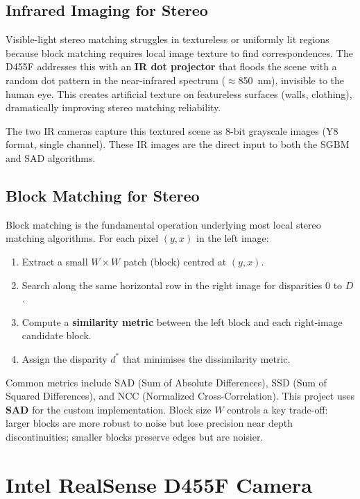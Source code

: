 \documentclass[12pt, a4paper]{article}
\begin{document}
\subsection{Infrared Imaging for Stereo}

Visible-light stereo matching struggles in textureless or uniformly lit regions
because block matching requires local image texture to find correspondences.
The D455F addresses this with an \textbf{IR dot projector} that floods the scene
with a random dot pattern in the near-infrared spectrum ($\approx$850~nm),
invisible to the human eye. This creates artificial texture on featureless
surfaces (walls, clothing), dramatically improving stereo matching reliability.

The two IR cameras capture this textured scene as 8-bit grayscale images
(Y8 format, single channel). These IR images are the direct input to both the
SGBM and SAD algorithms.

\subsection{Block Matching for Stereo}

Block matching is the fundamental operation underlying most local stereo
matching algorithms. For each pixel $(y, x)$ in the left image:

\begin{enumerate}
  \item Extract a small $W \times W$ patch (block) centred at $(y, x)$.
  \item Search along the same horizontal row in the right image for disparities
        $0$ to $D$.
  \item Compute a \textbf{similarity metric} between the left block and each
        right-image candidate block.
  \item Assign the disparity $d^*$ that minimises the dissimilarity metric.
\end{enumerate}

Common metrics include SAD (Sum of Absolute Differences), SSD (Sum of Squared
Differences), and NCC (Normalized Cross-Correlation). This project uses
\textbf{SAD} for the custom implementation. Block size $W$ controls a key
trade-off: larger blocks are more robust to noise but lose precision near depth
discontinuities; smaller blocks preserve edges but are noisier.

\section{Intel RealSense D455F Camera}
\end{document}
